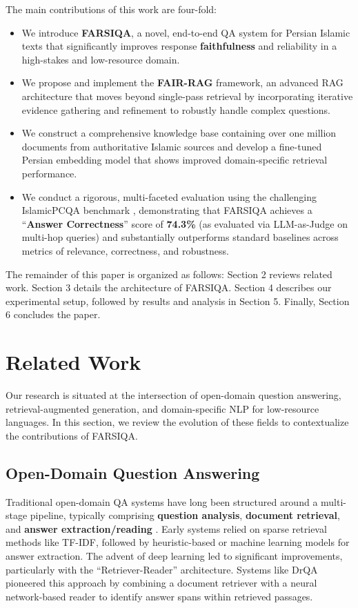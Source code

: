 \documentclass[11pt]{article}
\begin{document}
The main contributions of this work are four-fold:

\begin{itemize}
    \item We introduce \textbf{FARSIQA}, a novel, end-to-end QA system for Persian Islamic texts that significantly improves response \textbf{faithfulness} and reliability in a high-stakes and low-resource domain.
    \item We propose and implement the \textbf{FAIR-RAG} framework, an advanced RAG architecture that moves beyond single-pass retrieval by incorporating iterative evidence gathering and refinement to robustly handle complex questions.
    \item We construct a comprehensive knowledge base containing over one million documents from authoritative Islamic sources and develop a fine-tuned Persian embedding model that shows improved domain-specific retrieval performance.
    \item We conduct a rigorous, multi-faceted evaluation using the challenging IslamicPCQA benchmark \cite{11075543}, demonstrating that FARSIQA achieves a ``\textbf{Answer Correctness}'' score of \textbf{74.3\%} (as evaluated via LLM-as-Judge on multi-hop queries) and substantially outperforms standard baselines across metrics of relevance, correctness, and robustness.
\end{itemize}

The remainder of this paper is organized as follows: Section 2 reviews related work. Section 3 details the architecture of FARSIQA. Section 4 describes our experimental setup, followed by results and analysis in Section 5. Finally, Section 6 concludes the paper.

\section{Related Work}

Our research is situated at the intersection of open-domain question answering, retrieval-augmented generation, and domain-specific NLP for low-resource languages. In this section, we review the evolution of these fields to contextualize the contributions of FARSIQA.

\subsection{Open-Domain Question Answering}

Traditional open-domain QA systems have long been structured around a multi-stage pipeline, typically comprising \textbf{question analysis}, \textbf{document retrieval}, and \textbf{answer extraction/reading} \cite{jurafsky2023speech}. Early systems relied on sparse retrieval methods like TF-IDF, followed by heuristic-based or machine learning models for answer extraction. The advent of deep learning led to significant improvements, particularly with the ``Retriever-Reader'' architecture. \cite{chen2017reading} Systems like DrQA \cite{chen2017reading} pioneered this approach by combining a document retriever with a neural network-based reader to identify answer spans within retrieved passages.
\end{document}
